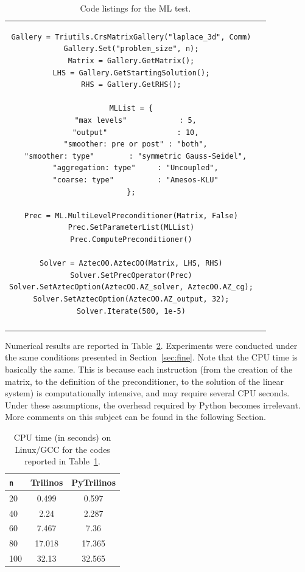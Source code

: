 \documentclass[10pt,relax]{SANDreport}
\begin{document}
\begin{table}
\begin{tabular}{| c  | c|}
\begin{minipage}{10.5cm}
\begin{verbatim}
Gallery = Triutils.CrsMatrixGallery("laplace_3d", Comm)
Gallery.Set("problem_size", n);
Matrix = Gallery.GetMatrix();
LHS = Gallery.GetStartingSolution();
RHS = Gallery.GetRHS();

MLList = {
  "max levels"            : 5,
  "output"                : 10,
  "smoother: pre or post" : "both",
  "smoother: type"        : "symmetric Gauss-Seidel",
  "aggregation: type"     : "Uncoupled",
  "coarse: type"          : "Amesos-KLU"
};

Prec = ML.MultiLevelPreconditioner(Matrix, False)
Prec.SetParameterList(MLList)
Prec.ComputePreconditioner()

Solver = AztecOO.AztecOO(Matrix, LHS, RHS)
Solver.SetPrecOperator(Prec)
Solver.SetAztecOption(AztecOO.AZ_solver, AztecOO.AZ_cg);
Solver.SetAztecOption(AztecOO.AZ_output, 32);
Solver.Iterate(500, 1e-5)
\end{verbatim}
\end{minipage}
\\
&  \\
\hline
\end{tabular}
\caption{Code listings for the ML test.}
\label{tab:code_ml}
\end{table}

Numerical results are reported in Table~\ref{tab:time_ml}. Experiments were
conducted under the same conditions presented in Section~\ref{sec:fine}. Note
that the CPU time is basically the same. This is because each instruction
(from the creation of the matrix, to the definition of the preconditioner, to
 the solution of the linear system) is computationally intensive, and may
require several CPU seconds. Under these assumptions, the overhead required by
Python becomes irrelevant. More comments on this subject can be found in the
following Section.

\begin{table}
\begin{center}
\begin{tabular}{| l | c | c |}
\hline
\tt n & Trilinos & PyTrilinos \\
\hline
20  & 0.499  & 0.597 \\
40  & 2.24   & 2.287 \\
60  & 7.467  & 7.36 \\
80  & 17.018 & 17.365 \\
100 & 32.13  & 32.565 \\
\hline
\end{tabular}
\caption{CPU time (in seconds) on Linux/GCC for the codes reported in
Table~\ref{tab:code_ml}.}
\label{tab:time_ml}
\end{center}
\end{table}
\end{document}

